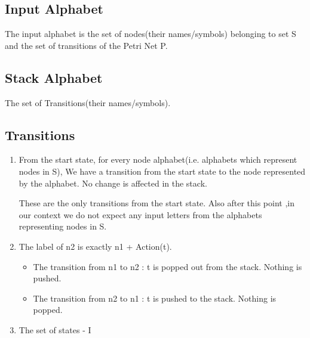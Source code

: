 \documentclass[a4paper,10pt]{article}
\begin{document}
   \subsection{Input Alphabet}
     The input alphabet is the set of nodes(their names/symbols) belonging to set S and the set of transitions of the Petri Net P.
   
   \subsection{Stack Alphabet}
     The set of Transitions(their names/symbols).
     
   
   \subsection{Transitions}
   \begin{enumerate}
      \item  From the start state, for every node alphabet(i.e. alphabets which represent nodes in S),
            We have a transition from the start state to the node represented by the alphabet. 
            No change is affected in the stack. 
      \begin{center}

      \end{center}
      These are the only transitions from the start state. 
      \newline
      Also after this point ,in our context we do not expect any input letters from the 
      alphabets representing nodes in S.
      
      \item
      The label of n2 is exactly n1 + Action(t). 
      \begin{itemize}
        \item The transition from n1 to n2 : t is popped out from the stack. Nothing is pushed.
        \item The transition from n2 to n1 : t is pushed to the stack. Nothing is popped.
      \end{itemize}
      
      \begin{center}

      \end{center}
        
      \item  The set of states - I
    \end{enumerate}

    
    
\end{document}
